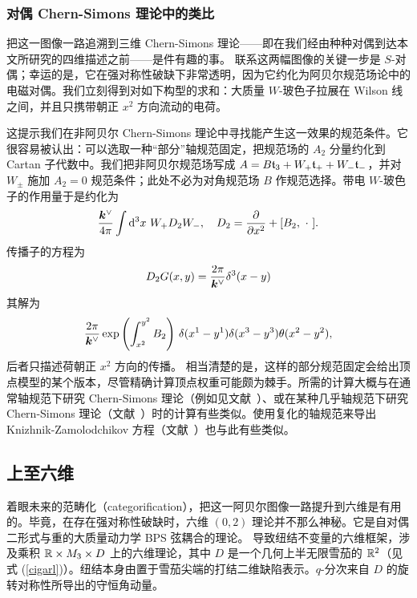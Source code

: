 \subsubsection{对偶 Chern-Simons 理论中的类比}\label{dualch}

把这一图像一路追溯到三维 Chern-Simons 理论——即在我们经由种种对偶到达本文所研究的四维描述之前——是件有趣的事。
联系这两幅图像的关键一步是 $S$-对偶；幸运的是，它在强对称性破缺下非常透明，因为它约化为阿贝尔规范场论中的电磁对偶。我们立刻得到对如下构型的求和：大质量 $W$-玻色子拉展在 Wilson 线之间，并且只携带朝正 $x^2$ 方向流动的电荷。

这提示我们在非阿贝尔 Chern-Simons 理论中寻找能产生这一效果的规范条件。它很容易被认出：可以选取一种“部分”轴规范固定，把规范场的 $A_2$ 分量约化到 Cartan 子代数中。我们把非阿贝尔规范场写成 $A=B\frak t_3+W_+\frak t_++W_-\frak t_-$，并对 $W_\pm$ 施加 $A_2=0$ 规范条件；此处不必为对角规范场 $B$ 作规范选择。带电 $W$-玻色子的作用量于是约化为
\begin{equation}
\frac{\k^\vee}{4\pi}\int \d^3x \,\,W_+ D_2 W_-,~~~   D_2=\frac{\partial}{\partial x^2}+[B_2,\,\,\cdot\,\,].
\end{equation}
传播子的方程为
\begin{equation}
D_2 G(x,y) = \frac{2\pi}{\k^\vee}\delta^3(x-y)
\end{equation}
其解为
\begin{equation}\label{dox}
\frac{2\pi}{\k^\vee} 
\exp\left(\int_{x^2}^{y^2} B_2\right)\, \delta(x^1-y^1) \delta(x^3-y^3) \theta(x^2 - y^2),
\end{equation}
后者只描述荷朝正 $x^2$ 方向的传播。
相当清楚的是，这样的部分规范固定会给出顶点模型的某个版本，尽管精确计算顶点权重可能颇为棘手。所需的计算大概与在通常轴规范下研究 Chern-Simons 理论（例如见文献~\cite{AS,Hahn}）、或在某种几乎轴规范下研究 Chern-Simons 理论（文献~\cite{Wetering}）时的计算有些类似。使用复化的轴规范来导出 Knizhnik-Zamolodchikov 方程（文献~\cite{FK}）也与此有些类似。


\subsection{上至六维}
着眼未来的范畴化（categorification），把这一阿贝尔图像一路提升到六维是有用的。毕竟，在存在强对称性破缺时，六维 $(0,2)$ 理论并不那么神秘。它是自对偶二形式与重的大质量动力学 BPS 弦耦合的理论。
导致纽结不变量的六维框架，涉及乘积 $\R \times M_3 \times D$ 上的六维理论，其中 $D$ 是一个几何上半无限雪茄的 $\R^2$（见式 (\ref{cigarl})）。纽结本身由置于雪茄尖端的打结二维缺陷表示。$q$-分次来自 $D$ 的旋转对称性所导出的守恒角动量。

